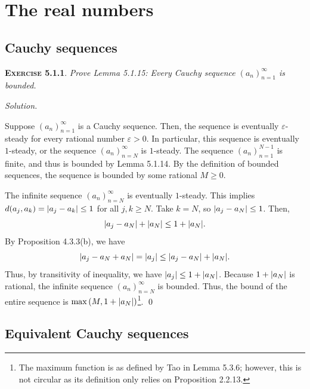 \documentclass[12pt]{article}
\theoremstyle{remark}
\newenvironment{exer}[2]{
    \noindent \setlength{\parskip}{1em}%
    \textsc{\textbf{Exercise #1}}. \textit{#2} \par
    \noindent \textit{Solution.} %
}{\bigskip}
\begin{document}
\pagebreak


\section{The real numbers}
\subsection{Cauchy sequences}

\begin{exer}{5.1.1}{
    Prove Lemma 5.1.15:
    Every Cauchy sequence $(a_n)^\infty_{n=1}$ is bounded.
}
    Suppose $(a_n)^\infty_{n=1}$ is a Cauchy sequence.
    Then, the sequence is eventually $\varepsilon$-steady for every rational number $\varepsilon > 0$.
    In particular, this sequence is eventually $1$-steady, or the sequence $(a_n)^\infty_{n=N}$ is $1$-steady.
    The sequence $(a_n)^{N-1}_{n=1}$ is finite, and thus is bounded by Lemma 5.1.14.
    By the definition of bounded sequences, the sequence is bounded by some rational $M \ge 0$.
    
    The infinite sequence $(a_n)^\infty_{n=N}$ is eventually $1$-steady.
    This implies $d(a_j, a_k) = \abs{a_j - a_k} \le 1$ for all $j, k \ge N$.
    Take $k = N$, so $\abs{a_j - a_N} \le 1$.
    Then, 
    \[
        \abs{a_j - a_N} + \abs{a_N} \le 1 + \abs{a_N}.
    \]
    By Proposition 4.3.3(b), we have
    \[
        \abs{a_j - a_N + a_N} = \abs{a_j} \le \abs{a_j - a_N} + \abs{a_N}.
    \]
    Thus, by transitivity of inequality, we have $\abs{a_j} \le 1 + \abs{a_N}$.
    Because $1 + \abs{a_N}$ is rational, the infinite sequence $(a_n)^\infty_{n=N}$ is bounded.
    Thus, the bound of the entire sequence is $\max{(M, 1 + \abs{a_N})}$\footnote{The maximum function is as defined by Tao in Lemma 5.3.6; however, this is not circular as its definition only relies on Proposition 2.2.13.}. \qed
\end{exer}


\subsection{Equivalent Cauchy sequences}
\end{document}
